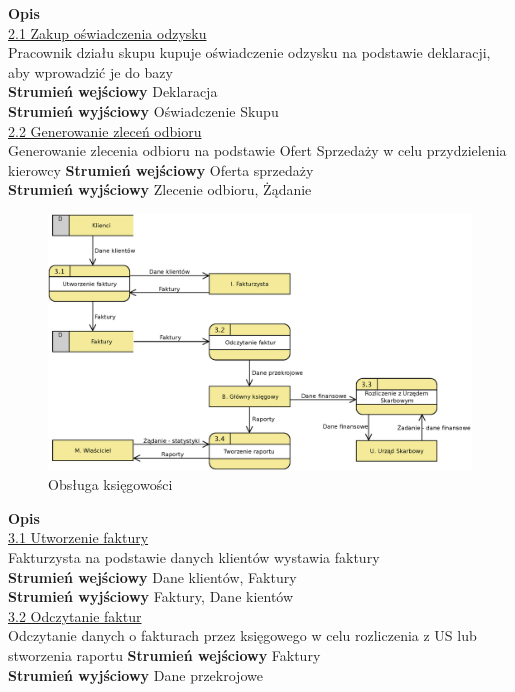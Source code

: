 	\textbf{Opis} \\
	\underline{2.1 Zakup oświadczenia odzysku}\\
	Pracownik działu skupu kupuje oświadczenie odzysku na podstawie deklaracji, aby wprowadzić je do bazy \\
	\textbf{Strumień wejściowy} Deklaracja \\
	\textbf{Strumień wyjściowy} Oświadczenie Skupu \\
	
	\underline{2.2 Generowanie zleceń odbioru}\\
	Generowanie zlecenia odbioru na podstawie Ofert Sprzedaży w celu przydzielenia kierowcy
	\textbf{Strumień wejściowy} Oferta sprzedaży \\
	\textbf{Strumień wyjściowy} Zlecenie odbioru, Żądanie \\
	
	\begin{figure}[H]
		\centering
		\centerline{\includegraphics[width=1.1\textwidth]{img/DFD/2-level-ksiegowosc.eps}}
		\caption{Obsługa księgowości}
	\end{figure}

	\textbf{Opis} \\
	\underline{3.1 Utworzenie faktury}\\
	Fakturzysta na podstawie danych klientów wystawia faktury \\
	\textbf{Strumień wejściowy} Dane klientów, Faktury \\
	\textbf{Strumień wyjściowy} Faktury, Dane kientów \\
	
	\underline{3.2 Odczytanie faktur}\\
	Odczytanie danych o fakturach przez księgowego w celu rozliczenia z US lub stworzenia raportu
	\textbf{Strumień wejściowy} Faktury\\
	\textbf{Strumień wyjściowy} Dane przekrojowe \\

